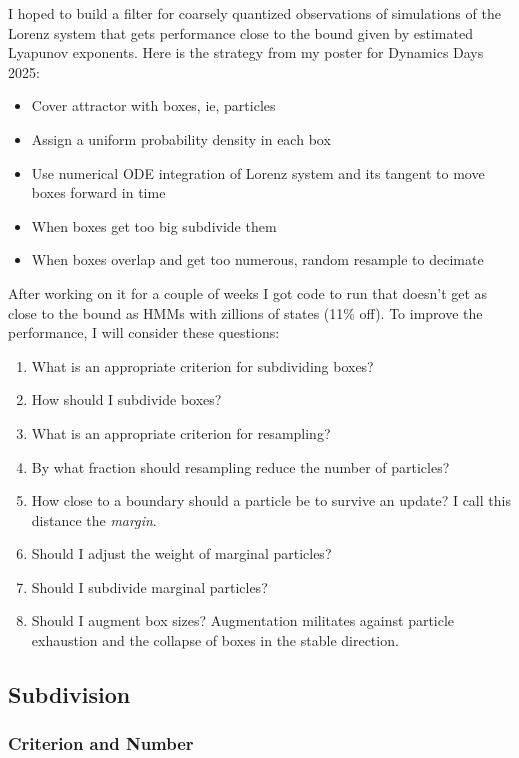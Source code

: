 \documentclass[12pt]{article}
\begin{document}
I hoped to build a filter for coarsely quantized observations of
simulations of the Lorenz system that gets performance close to the
bound given by estimated Lyapunov exponents.  Here is the strategy
from my poster for Dynamics Days 2025:
\begin{itemize}
\item Cover attractor with boxes, ie, particles
\item Assign a uniform probability density in each box
\item Use numerical ODE integration of Lorenz system and its tangent
  to move boxes forward in time
\item When boxes get too big subdivide them
\item When boxes overlap and get too numerous, random resample to
  decimate
\end{itemize}

After working on it for a couple of weeks I got code to run that
doesn't get as close to the bound as HMMs with zillions of states
(11\% off).  To improve the performance, I will consider these
questions:
\begin{enumerate}
\item \label{q:subdivide_criterion} What is an appropriate criterion
  for subdividing boxes?
\item \label{q:subdivide_new_boxes} How should I subdivide boxes?
\item What is an appropriate criterion for resampling?
\item By what fraction should resampling reduce the number of
  particles?
\item How close to a boundary should a particle be to survive an
  update?  I call this distance the \emph{margin}.
\item Should I adjust the weight of marginal particles?
\item Should I subdivide marginal particles?
\item Should I augment box sizes?  Augmentation militates against
  particle exhaustion and the collapse of boxes in the stable
  direction.
\end{enumerate}

\subsection{Subdivision}
\label{sec:subdivision}

\subsubsection{Criterion and Number}
\label{sec:criterion}
\end{document}
